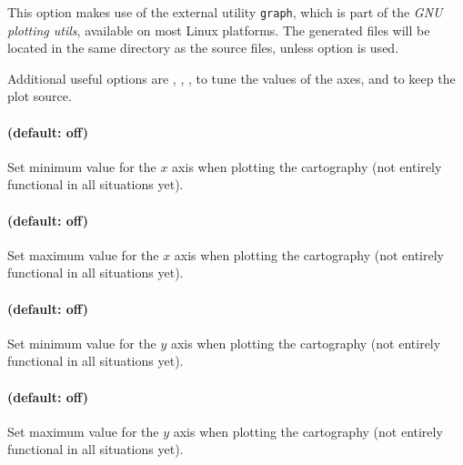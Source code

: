 This option makes use of the external utility \texttt{graph}, which is
part of the \emph{GNU plotting utils}, available on most Linux
platforms.
The generated files will be located in the same directory as the source files, unless option  is used.

Additional useful options are
,
,
,
to tune the values of the axes,
and  to keep the plot source.


\paragraph{ (default: off)}
Set minimum value for the $x$ axis when plotting the cartography (not entirely functional in all situations yet).

\paragraph{ (default: off)}
Set maximum value for the $x$ axis when plotting the cartography (not entirely functional in all situations yet).

\paragraph{ (default: off)}
Set minimum value for the $y$ axis when plotting the cartography (not entirely functional in all situations yet).

\paragraph{ (default: off)}
Set maximum value for the $y$ axis when plotting the cartography (not entirely functional in all situations yet).



